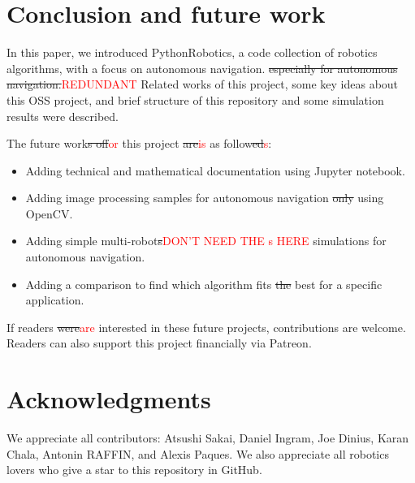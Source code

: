 \documentclass{bmvc2k}
\def\jwd{\textcolor{red}}
\begin{document}
\section{Conclusion and future work}

In this paper, we introduced PythonRobotics, a code collection of robotics algorithms, with a focus on autonomous navigation. \st{especially for autonomous navigation.}\jwd{REDUNDANT}
Related works of this project, some key ideas about this OSS project, and brief structure of this repository and some simulation results were described. 

The future work\st{s of}\jwd{for} this project \st{are}\jwd{is} as follow\st{ed}\jwd{s}: 

\begin{itemize}
 \item Adding technical and mathematical documentation using Jupyter notebook\cite{JupyterNotebook}.  
 \item Adding image processing samples for autonomous navigation \st{only} using OpenCV\cite{opencv}.
 \item Adding simple multi-robot\st{s}\jwd{DON'T NEED THE s HERE} simulations for autonomous navigation.
 \item Adding a comparison to find which algorithm fits \st{the} best for a specific application.
\end{itemize}

If readers \st{were}\jwd{are} interested in these future projects, contributions are welcome.
Readers can also support this project financially via Patreon\cite{patreon}.

\section{Acknowledgments}

We appreciate all contributors: Atsushi Sakai\cite{auther5}, Daniel Ingram\cite{auther1}, Joe Dinius\cite{auther2}, Karan Chala\cite{auther3}, Antonin RAFFIN\cite{auther4}, and Alexis Paques\cite{auther6}.
We also appreciate all robotics lovers who give a star to this repository in GitHub.



\end{document}
